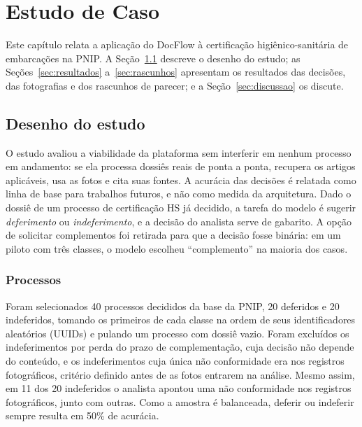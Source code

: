\chapter{Estudo de Caso}
\label{cap:estudo-caso}

Este capítulo relata a aplicação do DocFlow à certificação higiênico-sanitária de embarcações na PNIP. A Seção~\ref{sec:desenho} descreve o desenho do estudo; as Seções~\ref{sec:resultados} a~\ref{sec:rascunhos} apresentam os resultados das decisões, das fotografias e dos rascunhos de parecer; e a Seção~\ref{sec:discussao} os discute.

\section{Desenho do estudo}
\label{sec:desenho}

O estudo avaliou a viabilidade da plataforma sem interferir em nenhum processo em andamento: se ela processa dossiês reais de ponta a ponta, recupera os artigos aplicáveis, usa as fotos e cita suas fontes. A acurácia das decisões é relatada como linha de base para trabalhos futuros, e não como medida da arquitetura. Dado o dossiê de um processo de certificação HS já decidido, a tarefa do modelo é sugerir \textit{deferimento} ou \textit{indeferimento}, e a decisão do analista serve de gabarito. A opção de solicitar complementos foi retirada para que a decisão fosse binária: em um piloto com três classes, o modelo escolheu ``complemento'' na maioria dos casos.

\subsection{Processos}

Foram selecionados 40 processos decididos da base da PNIP, 20 deferidos e 20 indeferidos, tomando os primeiros de cada classe na ordem de seus identificadores aleatórios (UUIDs) e pulando um processo com dossiê vazio. Foram excluídos os indeferimentos por perda do prazo de complementação, cuja decisão não depende do conteúdo, e os indeferimentos cuja única não conformidade era nos registros fotográficos, critério definido antes de as fotos entrarem na análise. Mesmo assim, em 11 dos 20 indeferidos o analista apontou uma não conformidade nos registros fotográficos, junto com outras. Como a amostra é balanceada, deferir ou indeferir sempre resulta em 50\% de acurácia.

